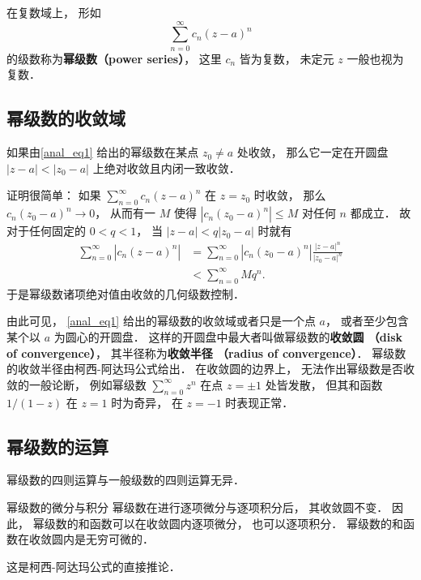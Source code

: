 

在复数域上， 形如
\begin{equation}\label{anal_eq1}
\sum_{n=0}^\infty c_n(z-a)^n
\end{equation}
的级数称为\textbf{幂级数（power series）}， 这里 $c_n$ 皆为复数， 未定元 $z$ 一般也视为复数． 

\subsection{幂级数的收敛域}
\begin{theorem}{}
如果由\autoref{anal_eq1} 给出的幂级数在某点 $z_0\neq a$ 处收敛， 那么它一定在开圆盘 $|z-a|<|z_0-a|$ 上绝对收敛且内闭一致收敛．
\end{theorem}

证明很简单： 如果 $\sum_{n=0}^\infty c_n(z-a)^n$ 在 $z=z_0$ 时收敛， 那么 $c_n(z_0-a)^n\to0$， 从而有一 $M$ 使得 $|c_n(z_0-a)^n|\leq M$ 对任何 $n$ 都成立． 故对于任何固定的 $0<q<1$， 当 $|z-a|<q|z_0-a|$ 时就有
$$
\begin{aligned}
\sum_{n=0}^\infty |c_n(z-a)^n|
&=\sum_{n=0}^\infty |c_n(z_0-a)^n|\frac{|z-a|^n}{|z_0-a|^n}\\
&<\sum_{n=0}^\infty Mq^n.
\end{aligned}
$$
于是幂级数诸项绝对值由收敛的几何级数控制．

由此可见， \autoref{anal_eq1} 给出的幂级数的收敛域或者只是一个点 $a$， 或者至少包含某个以 $a$ 为圆心的开圆盘． 这样的开圆盘中最大者叫做幂级数的\textbf{收敛圆 （disk of convergence）}， 其半径称为\textbf{收敛半径 （radius of convergence）}． 幂级数的收敛半径由柯西-阿达玛公式给出． 在收敛圆的边界上， 无法作出幂级数是否收敛的一般论断， 例如幂级数 $\sum_{n=0}^\infty z^n$ 在点 $z=\pm1$ 处皆发散， 但其和函数 $1/(1-z)$ 在 $z=1$ 时为奇异， 在 $z=-1$ 时表现正常．

\subsection{幂级数的运算}
幂级数的四则运算与一般级数的四则运算无异．

\begin{theorem}{幂级数的微分与积分}
幂级数在进行逐项微分与逐项积分后， 其收敛圆不变． 因此， 幂级数的和函数可以在收敛圆内逐项微分， 也可以逐项积分． 幂级数的和函数在收敛圆内是无穷可微的．
\end{theorem}
这是柯西-阿达玛公式的直接推论． 

